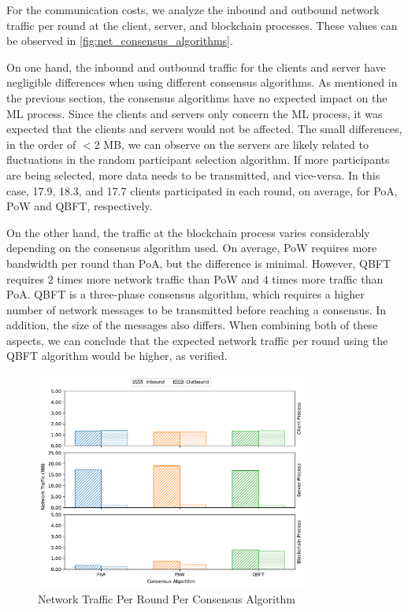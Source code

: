 For the communication costs, we analyze the inbound and outbound network traffic per round at the client, server, and blockchain processes. These values can be observed in \autoref{fig:net_consensus_algorithms}.

On one hand, the inbound and outbound traffic for the clients and server have negligible differences when using different consensus algorithms. As mentioned in the previous section, the consensus algorithms have no expected impact on the ML process. Since the clients and servers only concern the ML process, it was expected that the clients and servers would not be affected. The small differences, in the order of $< 2$ MB, we can observe on the servers are likely related to fluctuations in the random participant selection algorithm. If more participants are being selected, more data needs to be transmitted, and vice-versa. In this case, 17.9, 18.3, and 17.7 clients participated in each round, on average, for PoA, PoW and QBFT, respectively.

On the other hand, the traffic at the blockchain process varies considerably depending on the consensus algorithm used. On average, PoW requires more bandwidth per round than PoA, but the difference is minimal. However, QBFT requires $2$ times more network traffic than PoW and $4$ times more traffic than PoA. QBFT is a three-phase consensus algorithm, which requires a higher number of network messages to be transmitted before reaching a consensus. In addition, the size of the messages also differs. When combining both of these aspects, we can conclude that the expected network traffic per round using the QBFT algorithm would be higher, as verified.

\begin{figure}[!ht]
    \centering
    \centering
    \includegraphics[width=0.8\textwidth]{graphics/consensus/net.pdf}
    \caption{Network Traffic Per Round Per Consensus Algorithm}
    \label{fig:net_consensus_algorithms}
\end{figure}

